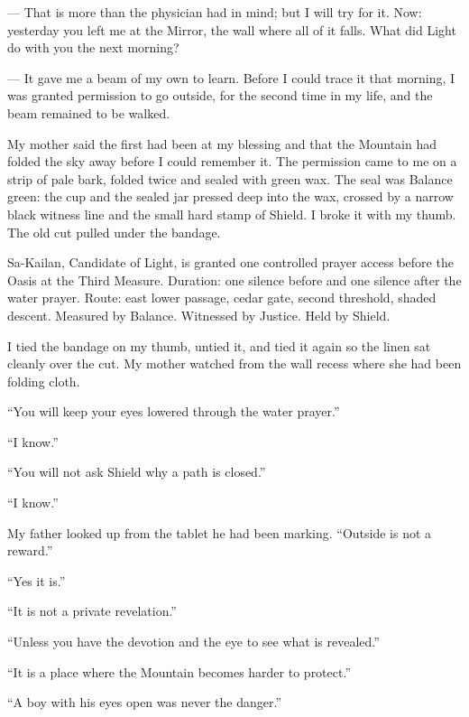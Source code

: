 \begin{room}
--- That is more than the physician had in mind; but I will try for it. Now: yesterday you left me at the Mirror, the wall where all of it falls. What did Light do with you the next morning?

--- It gave me a beam of my own to learn. Before I could trace it that morning, I was granted permission to go outside, for the second time in my life, and the beam remained to be walked.

\end{room}

My mother said the first had been at my blessing and that the Mountain had folded the sky away before I could remember it. The permission came to me on a strip of pale bark, folded twice and sealed with green wax. The seal was Balance green: the cup and the sealed jar pressed deep into the wax, crossed by a narrow black witness line and the small hard stamp of Shield. I broke it with my thumb. The old cut pulled under the bandage.\par

\begin{scripture}
Sa-Kailan, Candidate of Light, is granted one controlled prayer access before the Oasis at the Third Measure. Duration: one silence before and one silence after the water prayer. Route: east lower passage, cedar gate, second threshold, shaded descent. Measured by Balance. Witnessed by Justice. Held by Shield.\par
\end{scripture}

I tied the bandage on my thumb, untied it, and tied it again so the linen sat cleanly over the cut. My mother watched from the wall recess where she had been folding cloth.\par

``You will keep your eyes lowered through the water prayer.''\par
``I know.''\par
``You will not ask Shield why a path is closed.''\par
``I know.''\par

My father looked up from the tablet he had been marking. ``Outside is not a reward.''\par

``Yes it is.''\par
``It is not a private revelation.''\par
``Unless you have the devotion and the eye to see what is revealed.''\par
``It is a place where the Mountain becomes harder to protect.''\par
``A boy with his eyes open was never the danger.'' \par

